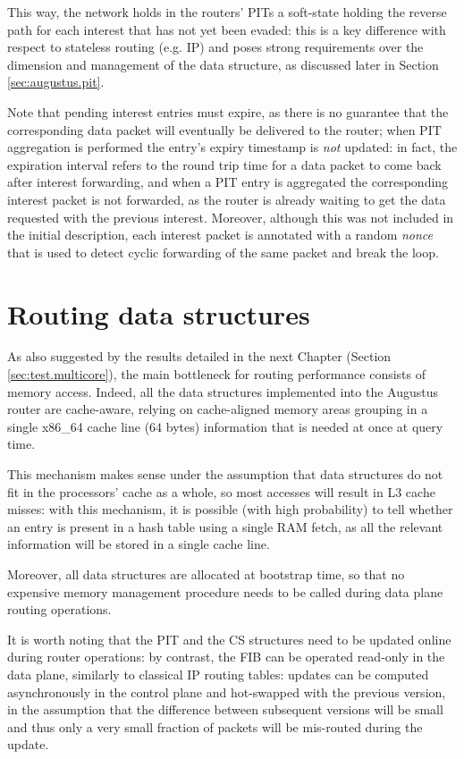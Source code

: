 \documentclass[11pt,a4paper,twoside,titlepage,openany]{book}
\begin{document}
This way, the network holds in the routers' \gls{PIT}s a soft-state holding the reverse path for each interest that has not yet been evaded: this is a key difference with respect to stateless routing (e.g. IP) and poses strong requirements over the dimension and management of the data structure, as discussed later in Section \ref{sec:augustus.pit}.

Note that pending interest entries must expire, as there is no guarantee that the corresponding data packet will eventually be delivered to the router; when PIT aggregation is performed the entry's expiry timestamp is \emph{not} updated: in fact, the expiration interval refers to the round trip time for a data packet to come back after interest forwarding, and when a PIT entry is aggregated the corresponding interest packet is not forwarded, as the router is already waiting to get the data requested with the previous interest.  Moreover, although this was not included in the initial description, each interest packet is annotated with a random \emph{nonce} that is used to detect cyclic forwarding of the same packet and break the loop.


\section{Routing data structures}\label{sec:augustus.structures}
As also suggested by the results detailed in the next Chapter (Section \ref{sec:test.multicore}), the main bottleneck for routing performance consists of memory access. Indeed, all the data structures implemented into the Augustus router are cache-aware, relying on cache-aligned memory areas grouping in a single x86\_64 cache line ($64$ bytes) information that is needed at once at query time.

This mechanism makes sense under the assumption that data structures do not fit in the processors' cache as a whole, so most accesses will result in L3 cache misses: with this mechanism, it is possible (with high probability) to tell whether an entry is present in a hash table using a single RAM fetch, as all the relevant information will be stored in a single cache line.

Moreover, all data structures are allocated at bootstrap time, so that no expensive memory management procedure needs to be called during data plane routing operations.

It is worth noting that the \gls{PIT} and the \gls{CS} structures need to be updated online during router operations: by contrast, the \gls{FIB} can be operated read-only in the data plane, similarly to classical IP routing tables: updates can be computed asynchronously in the control plane and hot-swapped with the previous version, in the assumption that the difference between subsequent versions will be small and thus only a very small fraction of packets will be mis-routed during the update.
\end{document}
